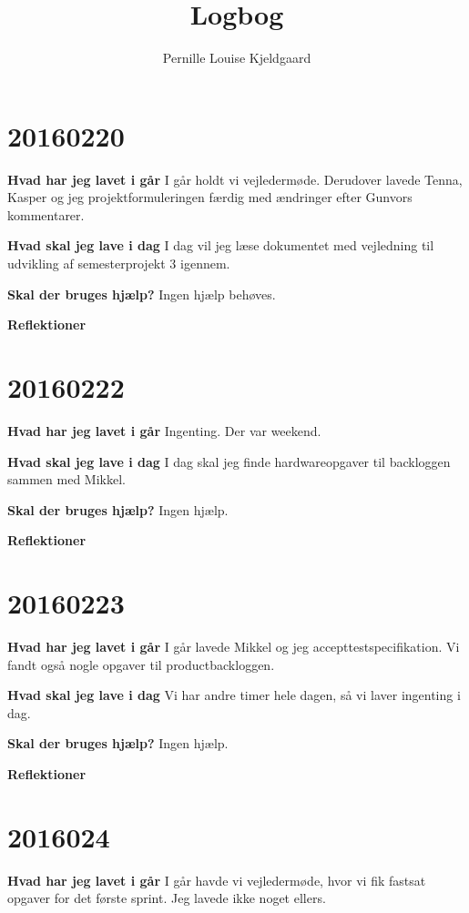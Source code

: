 \documentclass{article}
\title{Logbog}
\author{Pernille Louise Kjeldgaard}
\date{}
\begin{document}
	\maketitle
	\tableofcontents
	
	\section{20160220}
	
	\textbf{Hvad har jeg lavet i går}
	I går holdt vi vejledermøde. Derudover lavede Tenna, Kasper og jeg projektformuleringen færdig med ændringer efter Gunvors kommentarer. 
	
	\textbf{Hvad skal jeg lave i dag}
	I dag vil jeg læse dokumentet med vejledning til udvikling af semesterprojekt 3 igennem. 
	
	\textbf{Skal der bruges hjælp?}
	Ingen hjælp behøves. 
	
	\textbf{Reflektioner}
			
	\section{20160222}
		
	\textbf{Hvad har jeg lavet i går}
	Ingenting. Der var weekend. 
	
	\textbf{Hvad skal jeg lave i dag}
	I dag skal jeg finde hardwareopgaver til backloggen sammen med Mikkel. 
	
	\textbf{Skal der bruges hjælp?}
	Ingen hjælp. 
	
	\textbf{Reflektioner}
	
	\section{20160223}
	
	\textbf{Hvad har jeg lavet i går}
	\subitem I går lavede Mikkel og jeg accepttestspecifikation. Vi fandt også nogle opgaver til productbackloggen. 
	
	\textbf{Hvad skal jeg lave i dag}
	\subitem Vi har andre timer hele dagen, så vi laver ingenting i dag. 
	
	\textbf{Skal der bruges hjælp?}
	\subitem Ingen hjælp. 
	
	\textbf{Reflektioner}
	
	\section{2016024}
	
	\textbf{Hvad har jeg lavet i går}
	\subitem I går havde vi vejledermøde, hvor vi fik fastsat opgaver for det første sprint. Jeg lavede ikke noget ellers. 
	
\end{document}
